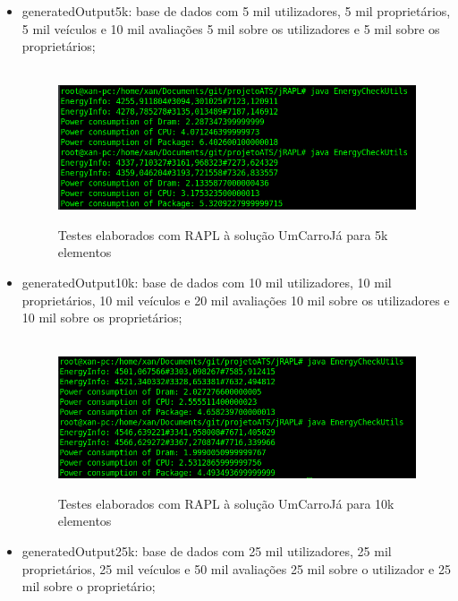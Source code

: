 \begin{itemize}
    \item generatedOutput5k: base de dados com 5 mil utilizadores, 5 mil proprietários, 5 mil veículos e 10 mil avaliações 5 mil sobre os utilizadores e 5 mil sobre os proprietários;
    
        \begin{figure}[H]
            \hbox{\hspace{-8em} \includegraphics[width=1.4\textwidth]{images/rapl_5k.png}}
            \label{fig52}
            \caption{Testes elaborados com RAPL à solução UmCarroJá para 5k elementos}
        \end{figure}
   
    \item generatedOutput10k: base de dados com 10 mil utilizadores, 10 mil proprietários, 10 mil veículos e 20 mil avaliações 10 mil sobre os utilizadores e 10 mil sobre os proprietários;
    
        \begin{figure}[H]
            \hbox{\hspace{-8em} \includegraphics[width=1.4\textwidth]{images/rapl_10k.png}}
            \label{fig53}
            \caption{Testes elaborados com RAPL à solução UmCarroJá para 10k elementos}
        \end{figure}
        
    \item generatedOutput25k: base de dados com 25 mil utilizadores, 25 mil proprietários, 25 mil veículos e 50 mil avaliações 25 mil sobre o utilizador e 25 mil sobre o proprietário;
    

\end{itemize}
